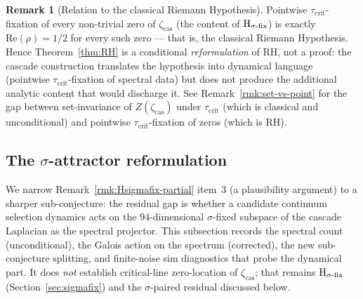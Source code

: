 \documentclass[11pt, a4paper]{amsart}
\theoremstyle{definition}
\newtheorem{remark}[theorem]{Remark}
\newcommand{\zetacas}{\zeta_{\mathrm{cas}}}
\begin{document}
\begin{remark}[Relation to the classical Riemann Hypothesis]\label{rmk:Hsigmafix-RH}
Pointwise $\tau_{\mathrm{crit}}$-fixation of every non-trivial zero
of $\zetacas$ (the content of $\textup{H}_{\sigma\text{-fix}}$) is
exactly $\mathrm{Re}(\rho) = 1/2$ for every such zero — that is, the
classical Riemann Hypothesis. Hence Theorem~\ref{thm:RH} is a
conditional \emph{reformulation} of RH, not a proof: the cascade
construction translates the hypothesis into dynamical language
(pointwise $\tau_{\mathrm{crit}}$-fixation of spectral data) but does
not produce the additional analytic content that would discharge it.
See Remark~\ref{rmk:set-vs-point} for the gap between set-invariance
of $Z(\zetacas)$ under $\tau_{\mathrm{crit}}$ (which is classical and
unconditional) and pointwise $\tau_{\mathrm{crit}}$-fixation of zeros
(which is RH).
\end{remark}

\subsection{The $\sigma$-attractor reformulation}\label{subsec:attractor}

We narrow Remark~\ref{rmk:Hsigmafix-partial} item~3 (a plausibility
argument) to a sharper sub-conjecture: the residual gap is whether
a candidate continuum selection dynamics acts on the
$94$-dimensional $\sigma$-fixed subspace of the cascade Laplacian
as the spectral projector.  This subsection records the spectral
count (unconditional), the Galois action on the spectrum (corrected),
the new sub-conjecture splitting, and finite-noise sim diagnostics
that probe the dynamical part.  It does \emph{not} establish
critical-line zero-location of $\zetacas$; that remains
$\textup{H}_{\sigma\text{-fix}}$ (Section~\ref{sec:sigmafix}) and
the $\sigma$-paired residual discussed below.
\end{document}
